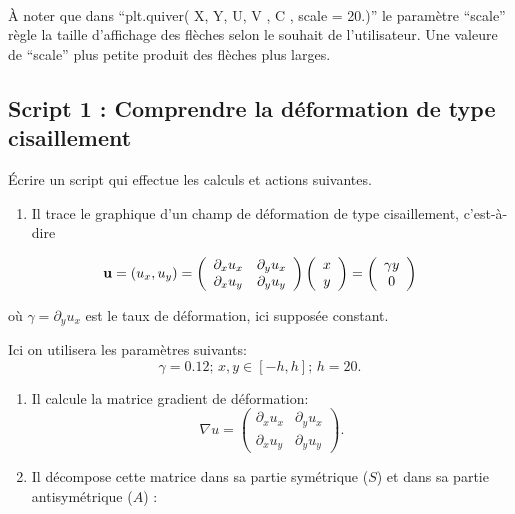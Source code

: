 \documentclass{article}
\begin{document}
    \begin{center}
    \end{center}
    { \hspace*{\fill} \\}
    
    À noter que dans ``plt.quiver( X, Y, U, V , C , scale = 20.)'' le
paramètre ``scale'' règle la taille d'affichage des flèches selon le
souhait de l'utilisateur. Une valeure de ``scale'' plus petite produit
des flèches plus larges.

    \subsection{Script 1 : Comprendre la déformation de type
cisaillement}\label{script-1-comprendre-la-duxe9formation-de-type-cisaillement}

    Écrire un script qui effectue les calculs et actions suivantes.

\begin{enumerate}
\def\labelenumi{\alph{enumi})}
\itemsep1pt\parskip0pt
\item
  Il trace le graphique d'un champ de déformation de type cisaillement,
  c'est-à-dire
\end{enumerate}

\[ {\bf u} = (u_x, u_y) = \left( \begin{array}{cc}
\partial_x u_x  & \partial_y u_x \\
\partial_x u_y  & \partial_y u_y \end{array} \right) 
\left( \begin{array}{c}
x   \\
y  \end{array} \right)=  
\left( \begin{array}{c}
\gamma y   \\
0  \end{array} \right)\]

où \(\gamma = \partial_y u_x\) est le taux de déformation, ici supposée
constant.

Ici on utilisera les paramètres suivants: \[
\gamma = 0.12; \, x,y \in [-h,h]; \, h = 20.
\]

\begin{enumerate}
\def\labelenumi{\alph{enumi})}
\setcounter{enumi}{1}
\item
  Il calcule la matrice gradient de déformation:
  \[ \nabla u =  \left( \begin{array}{cc}
  \partial_x u_x & \partial_y u_x  \\
  \partial_x u_y & \partial_y u_y \end{array} \right). \]
\item
  Il décompose cette matrice dans sa partie symétrique (\(S\)) et dans
  sa partie antisymétrique (\(A\)) :
\end{enumerate}
\end{document}
